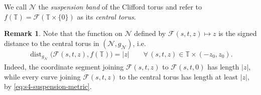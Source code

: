\documentclass[a4paper,11pt,oneside,reqno]{amsart}
\numberwithin{equation}{section}
\theoremstyle{definition}
\newtheorem{remark}[theorem]{Remark}
\begin{document}
We call $\mathcal{N}$ the \textit{suspension band} of the Clifford torus and refer to $f(\mathbb{T})=\mathcal{F}(\mathbb{T}\times\{0\})$ as its \textit{central torus}. 

\begin{remark}
 \label{rem:s4-signed-distance}
    Note that the function on $\mathcal{N}$ defined by $\mathcal{F}(s,t,z)\mapsto z$ is the signed distance to the central torus in $(\mathcal{N},g_{\mathcal{N}})$, i.e.
    \begin{align*}
        \operatorname{dist}_{g_{\mathcal{N}}}
        \bigl(\mathcal{F}(s,t,z),f(\mathbb{T})\bigr)=|z|
        \qquad\forall\,(s,t,z)\in
        \mathbb{T}\times(-z_0,z_0).
    \end{align*}
    Indeed, the coordinate segment joining $\mathcal{F}(s,t,z)$ to $\mathcal{F}(s,t,0)$ has length $|z|$, while every curve joining $\mathcal{F}(s,t,z)$ to the central torus has length at least $|z|$, by \eqref{eq:s4-suspension-metric}.
\end{remark}
%
%
\end{document}
